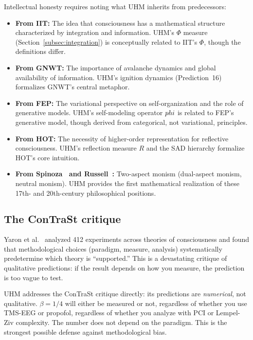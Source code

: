 Intellectual honesty requires noting what UHM inherits from predecessors:

\begin{itemize}[leftmargin=2em]
  \item \textbf{From IIT:} The idea that consciousness has a mathematical structure
        characterized by integration and information. UHM's $\Phi$ measure
        (Section~\ref{subsec:integration}) is conceptually related to IIT's $\Phi$, though
        the definitions differ.
  \item \textbf{From GNWT:} The importance of avalanche dynamics and global availability
        of information. UHM's ignition dynamics (Prediction~16) formalizes GNWT's central
        metaphor.
  \item \textbf{From FEP:} The variational perspective on self-organization and the
        role of generative models. UHM's self-modeling operator $phi$ is related to FEP's
        generative model, though derived from categorical, not variational, principles.
  \item \textbf{From HOT:} The necessity of higher-order representation for reflective
        consciousness. UHM's reflection measure $R$ and the SAD hierarchy formalize HOT's
        core intuition.
  \item \textbf{From Spinoza~\cite{spinoza1677} and Russell~\cite{russell1927}:}
        Two-aspect monism (dual-aspect monism, neutral monism). UHM provides the first
        mathematical realization of these 17th- and 20th-century philosophical positions.
\end{itemize}

\subsection{The ConTraSt critique}

Yaron et al.~\cite{yaron2022} analyzed 412 experiments across theories of consciousness
and found that methodological choices (paradigm, measure, analysis) systematically
predetermine which theory is ``supported.'' This is a devastating critique of qualitative
predictions: if the result depends on how you measure, the prediction is too vague to test.

UHM addresses the ConTraSt critique directly: its predictions are \emph{numerical}, not
qualitative. $\beta = 1/4$ will either be measured or not, regardless of whether you use
TMS-EEG or propofol, regardless of whether you analyze with PCI or Lempel-Ziv complexity.
The number does not depend on the paradigm. This is the strongest possible defense against
methodological bias.

